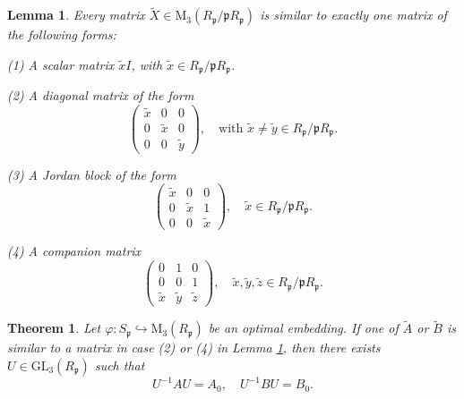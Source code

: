 \documentclass[10pt,a4paper]{amsart}
\newtheorem{lemma}{Lemma}
\newtheorem{theorem}{Theorem}
\begin{document}
\begin{lemma}\label{similar}
Every matrix $\widetilde{X}\in \mathrm{M}_3(R_\mathfrak{p}/\mathfrak{p}R_\mathfrak{p})$ is similar to exactly one matrix of the following forms:

(1) A scalar matrix $\widetilde{x}I$, with $\widetilde{x}\in R_\mathfrak{p}/\mathfrak{p}R_\mathfrak{p}$.

(2) A diagonal matrix of the form 
$$\begin{pmatrix}
\widetilde{x} & 0 & 0 \\
0 & \widetilde{x} & 0 \\
0 & 0 & \widetilde{y}
\end{pmatrix},\quad \text{with } \widetilde{x}\ne \widetilde{y}\in R_\mathfrak{p}/\mathfrak{p}R_\mathfrak{p}.$$

(3) A Jordan block of the form 
$$\begin{pmatrix}
\widetilde{x} & 0 & 0 \\
0 & \widetilde{x} & 1 \\
0 & 0 & \widetilde{x}
\end{pmatrix},\quad \widetilde{x}\in R_\mathfrak{p}/\mathfrak{p}R_\mathfrak{p}.$$

(4) A companion matrix 
$$\begin{pmatrix}
0 & 1 & 0 \\
0 & 0 & 1 \\
\widetilde{x} & \widetilde{y} & \widetilde{z}
\end{pmatrix},\quad \widetilde{x},\widetilde{y},\widetilde{z}\in R_\mathfrak{p}/\mathfrak{p}R_\mathfrak{p}.$$
\end{lemma}

\begin{theorem}
Let $\varphi : S_\mathfrak{p} \hookrightarrow \mathrm{M}_3(R_\mathfrak{p})$ be an optimal embedding. If one of $\widetilde{A}$ or $\widetilde{B}$ is similar to a matrix in case (2) or (4) in Lemma \ref{similar}, then there exists $U \in \mathrm{GL}_3(R_\mathfrak{p})$ such that 
$$U^{-1}AU = A_0,\quad U^{-1}BU = B_0.$$
\end{theorem}
\end{document}

